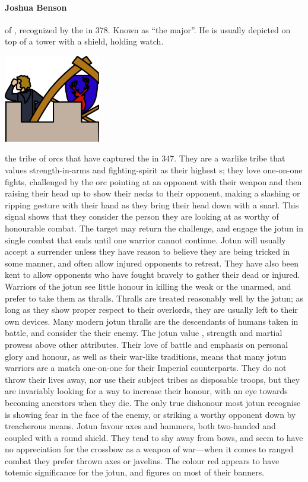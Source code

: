 \paragraph{Joshua Benson}  of , recognized by the  in 378. Known as “the major”. He is usually depicted on top of a tower with a shield, holding watch. \begin{center}\includegraphics[width=4.2cm]{encyclopedia/Major} \end{center}
 the tribe of  orcs that have captured the  in 347. They are a warlike tribe that values strength-in-arms and fighting-spirit as their highest s; they love one-on-one fights, challenged by the orc pointing at an opponent with their weapon and then raising their head up to show their necks to their opponent, making a slashing or ripping gesture with their hand as they bring their head down with a snarl. This signal shows that they consider the person they are looking at as worthy of honourable combat. The target may return the challenge, and engage the jotun in single combat that ends until one warrior cannot continue. \localpar Jotun will usually accept a surrender unless they have reason to believe they are being tricked in some manner, and often allow injured opponents to retreat. They have also been kent to allow opponents who have fought bravely to gather their dead or injured. Warriors of the jotun see little honour in killing the weak or the unarmed, and prefer to take them as thralls. Thralls are treated reasonably well by the jotun; as long as they show proper respect to their overlords, they are usually left to their own devices. Many modern jotun thralls are the descendants of humans taken in battle, and consider the  their enemy. \localpar The jotun value , strength and martial prowess above other attributes. Their love of battle and emphasis on personal glory and honour, as well as their war-like traditions, means that many jotun warriors are a match one-on-one for their Imperial counterparts. They do not throw their lives away, nor use their subject tribes as disposable troops, but they are invariably looking for a way to increase their honour, with an eye towards becoming ancestors when they die. The only true dishonour most jotun recognise is showing fear in the face of the enemy, or striking a worthy opponent down by treacherous means. \localpar Jotun favour axes and hammers, both two-handed and coupled with a round shield. They tend to shy away from bows, and seem to have no appreciation for the crossbow as a weapon of war—when it comes to ranged combat they prefer thrown axes or javelins. The colour red appears to have totemic significance for the jotun, and figures on most of their banners. 

